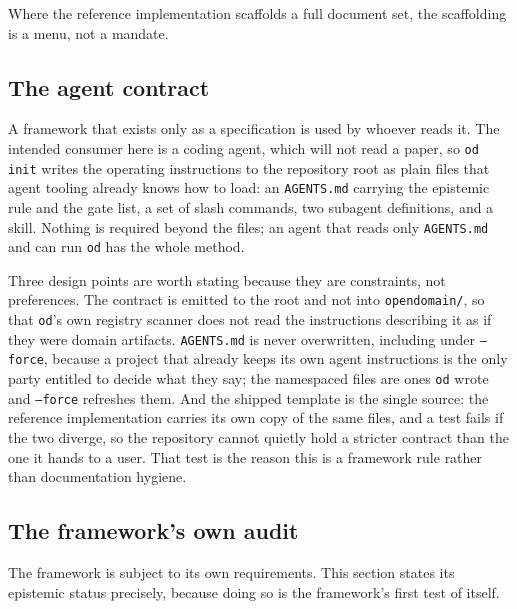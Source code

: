 \documentclass[11pt,a4paper]{article}
\begin{document}
Where the reference implementation scaffolds a full document set, the scaffolding is a menu, not a mandate.

\label{sec:agent-contract}
\subsection{The agent contract}

A framework that exists only as a specification is used by whoever reads it. The
intended consumer here is a coding agent, which will not read a paper, so
\texttt{od init} writes the operating instructions to the repository root as
plain files that agent tooling already knows how to load: an \texttt{AGENTS.md}
carrying the epistemic rule and the gate list, a set of slash commands, two
subagent definitions, and a skill. Nothing is required beyond the files; an agent
that reads only \texttt{AGENTS.md} and can run \texttt{od} has the whole method.

Three design points are worth stating because they are constraints, not
preferences. The contract is emitted to the root and not into
\texttt{opendomain/}, so that \texttt{od}'s own registry scanner does not read the
instructions describing it as if they were domain artifacts. \texttt{AGENTS.md} is
never overwritten, including under \texttt{--force}, because a project that
already keeps its own agent instructions is the only party entitled to decide
what they say; the namespaced files are ones \texttt{od} wrote and \texttt{--force}
refreshes them. And the shipped template is the single source: the reference
implementation carries its own copy of the same files, and a test fails if the two
diverge, so the repository cannot quietly hold a stricter contract than the one it
hands to a user. That test is the reason this is a framework rule rather than
documentation hygiene.

\subsection{The framework's own audit}

The framework is subject to its own requirements. This section states its epistemic status precisely, because doing so is the framework's first test of itself.
\end{document}
